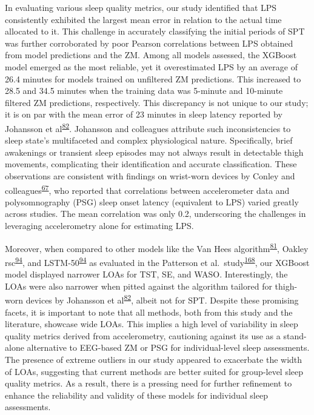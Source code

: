 \documentclass[
  10pt,
]{scrbook}
\begin{document}
In evaluating various sleep quality metrics, our study identified that
LPS consistently exhibited the largest mean error in relation to the
actual time allocated to it. This challenge in accurately classifying
the initial periods of SPT was further corroborated by poor Pearson
correlations between LPS obtained from model predictions and the ZM.
Among all models assessed, the XGBoost model emerged as the most
reliable, yet it overestimated LPS by an average of 26.4 minutes for
models trained on unfiltered ZM predictions. This increased to 28.5 and
34.5 minutes when the training data was 5-minute and 10-minute filtered
ZM predictions, respectively. This discrepancy is not unique to our
study; it is on par with the mean error of 23 minutes in sleep latency
reported by Johansson et
al\textsuperscript{\protect\hyperlink{ref-johansson_development_2023}{82}}.
Johansson and colleagues attribute such inconsistencies to sleep state's
multifaceted and complex physiological nature. Specifically, brief
awakenings or transient sleep episodes may not always result in
detectable thigh movements, complicating their identification and
accurate classification. These observations are consistent with findings
on wrist-worn devices by Conley and
colleagues\textsuperscript{\protect\hyperlink{ref-conley_agreement_2019}{67}},
who reported that correlations between accelerometer data and
polysomnography (PSG) sleep onset latency (equivalent to LPS) varied
greatly across studies. The mean correlation was only 0.2, underscoring
the challenges in leveraging accelerometry alone for estimating LPS.

Moreover, when compared to other models like the Van Hees
algorithm\textsuperscript{\protect\hyperlink{ref-hees_novel_2015}{81}},
Oakley
rsc\textsuperscript{\protect\hyperlink{ref-palotti_benchmark_2019}{94}},
and
LSTM-50\textsuperscript{\protect\hyperlink{ref-palotti_benchmark_2019}{94}}
as evaluated in the Patterson et
al.~study\textsuperscript{\protect\hyperlink{ref-patterson_40_2023}{168}},
our XGBoost model displayed narrower LOAs for TST, SE, and WASO.
Interestingly, the LOAs were also narrower when pitted against the
algorithm tailored for thigh-worn devices by Johansson et
al\textsuperscript{\protect\hyperlink{ref-johansson_development_2023}{82}},
albeit not for SPT. Despite these promising facets, it is important to
note that all methods, both from this study and the literature, showcase
wide LOAs. This implies a high level of variability in sleep quality
metrics derived from accelerometry, cautioning against its use as a
stand-alone alternative to EEG-based ZM or PSG for individual-level
sleep assessments. The presence of extreme outliers in our study
appeared to exacerbate the width of LOAs, suggesting that current
methods are better suited for group-level sleep quality metrics. As a
result, there is a pressing need for further refinement to enhance the
reliability and validity of these models for individual sleep
assessments.
\end{document}
